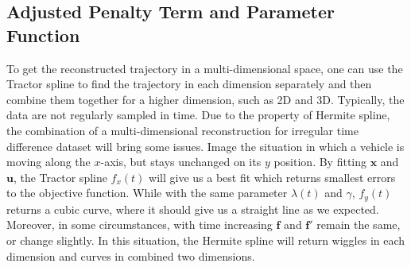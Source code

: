 



\subsection{Adjusted Penalty Term and Parameter Function}

To get the reconstructed trajectory in a multi-dimensional space, one can use the Tractor spline to find the trajectory in each dimension separately  and then combine them together for a higher dimension, such as 2D and 3D. Typically, the data are not regularly sampled in time. Due to the property of Hermite spline, the combination of a multi-dimensional reconstruction for irregular time difference dataset will bring some issues.  Image the situation in which a vehicle is moving along the $x$-axis, but stays unchanged on its $y$ position. By fitting $\mathbf{x}$ and $\mathbf{u}$, the Tractor spline $f_x(t)$ will give us a best fit which returns smallest errors to the objective function. While with the same parameter $\lambda(t)$ and $\gamma$, $f_y(t)$ returns a cubic curve, where it should give us a straight line as we expected. Moreover, in some circumstances, with time increasing $\mathbf{f}$ and $\mathbf{f}'$ remain the same, or change slightly. In this situation, the Hermite spline will return wiggles in each dimension and curves in combined two dimensions. 

